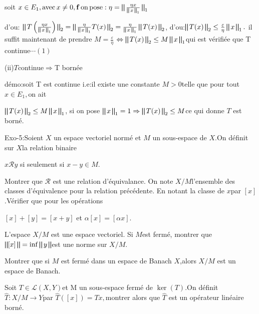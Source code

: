 \documentclass{article}
\begin{document}
soit $x \in E_1, \ensuremath{\operatorname{avec}}x \neq 0,
\mathbf{f}\ensuremath{\operatorname{on}}\ensuremath{\operatorname{pose}}: \eta
= \bigparallel \frac{\eta x}{\bigparallel x \bigparallel_1} \bigparallel_1$

d'ou: $\bigparallel T \left( \frac{\eta x}{\bigparallel x \bigparallel_1}
\right) \bigparallel_2 = \bigparallel \frac{\eta}{\bigparallel x
\bigparallel_1} T (x) \bigparallel_2 = \frac{\eta}{\bigparallel x
\bigparallel_1} \bigparallel T (x) \bigparallel_2$, d'ou:$\bigparallel T (x)
\bigparallel_2 \leq \frac{\varepsilon}{\eta} \bigparallel x \bigparallel_1 .$
il suffit maintenant de prendre $M = \frac{\varepsilon}{\eta}$
$\Leftrightarrow \bigparallel T (x) \bigparallel_2 \leq M \bigparallel x
\bigparallel_1$qui est v{\'e}rifi{\'e}e que T continue$\cdots (1)$

(ii)$T$continue$\Rightarrow$T born{\'e}e

d{\'e}mo:soit T est continue i.e:il existe une constante $M > 0$telle que pour
tout $x \in E_1,$on ait

$\bigparallel T (x) \bigparallel_2 \leq M \bigparallel x \bigparallel_1$, si
on pose $\bigparallel x \bigparallel_1 = 1 \Rightarrow  \bigparallel T (x)
\bigparallel_2 \leq M$ce qui donne $T$ est born{\'e}.

Exo-5:Soient $X$ un espace vectoriel norm{\'e} et $M$ un sous-espace de $X$.On
d{\'e}finit sur $X$la relation binaire

{\hspace{13em}}$x\mathcal{R}y$ si seulement si $x - y \in M.$

Montrer que $\mathcal{R}$ est une relation d'{\'e}quivalance. On note $X /
M$l'ensemble des classes d'{\'e}quivalence pour la relation
pr{\'e}c{\'e}dente. En notant la classe de $x$par $[x]$.V{\'e}rifier que pour
les op{\'e}rations

{\hspace{13em}}$[x] + [y] = [x + y]$ et $\alpha [x] = [\alpha x] .$

L'espace $X / M$ est une espace vectoriel. Si $M$est ferm{\'e}, montrer que
$\bigparallel [x] \bigparallel = \inf \bigparallel y \bigparallel$est une
norme sur $X / M.$

Montrer que si $M$ est ferm{\'e} dans un espace de Banach $X$,alors $X / M$
est un espace de Banach.

Soit $T \in \mathcal{L} (X, Y)$et M un sous-espace ferm{\'e} de $\ker (T) .$On
d{\'e}finit $\hat{T} : X / M \rightarrow Y$par $\hat{T} ([x]) = T x,$montrer
alors que $\hat{T}$ est un op{\'e}rateur lin{\'e}aire born{\'e}.
\end{document}
